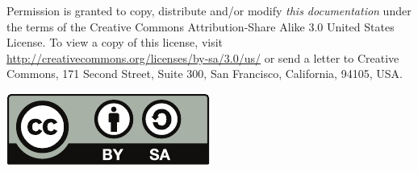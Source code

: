\begin{License}

Permission is granted to copy, distribute and/or modify \emph{this documentation}
under the terms of the Creative Commons Attribution-Share Alike 3.0
United States License. To view a copy of this license, visit
\url{http://creativecommons.org/licenses/by-sa/3.0/us/} or send a
letter to Creative Commons, 171 Second Street, Suite 300, San Francisco, California,
94105, USA.

\medskip

\hfill \includegraphics[scale=1.0]{images/doclicense-CC-by-sa.pdf}
\end{License}
